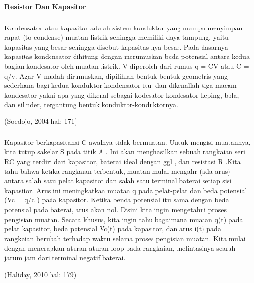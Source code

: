 \documentclass[12pt,a4paper]{article}
\begin{document}
\paragraph{ }
\textbf{Resistor Dan Kapasitor}
\subparagraph{ }
	Kondensator atau kapasitor adalah sistem konduktor yang mampu menyimpan rapat (to condense) muatan listrik sehingga memiliki daya tampung, yaitu kapasitas yang besar sehingga disebut kapasitas nya besar. Pada dasarnya kapasitas kondensator dihitung dengan merumuskan beda potensial antara kedua bagian kondesator oleh muatan listrik. V diperoleh dari rumus q = CV atau C = q/v. Agar V mudah dirumuskan, dipilihlah bentuk-bentuk geometris yang sederhana bagi kedua konduktor kondensator itu, dan dikenallah tiga macam kondesator yakni apa yang dikenal sebagai kodesator-kondesator keping, bola, dan silinder, tergantung bentuk konduktor-konduktornya.
\begin{flushright}
(Soedojo, 2004 hal: 171) 
\end{flushright}

\subparagraph{ }
	\begin{figure}
	
	\end{figure}
	Kapasitor berkapasitansi C awalnya tidak bermuatan. Untuk mengisi muatannya, kita tutup sakelar S pada titik A . Ini akan menghasilkan sebuah rangkaian seri RC yang terdiri dari kapasitor, baterai ideal dengan ggl , dan resistasi R .Kita tahu bahwa ketika rangkaian terbentuk, muatan mulai mengalir (ada arus) antara salah satu pelat kapasitor dan salah satu terminal baterai setiap sisi kapasitor. Arus ini meningkatkan muatan q pada pelat-pelat dan beda potensial (Vc = q/c ) pada kapasitor. Ketika benda potensial itu sama dengan beda potensial pada baterai, arus akan nol. Disini kita ingin mengetahui proses pengisian muatan. Secara khusus, kita ingin tahu bagaimana muatan q(t) pada pelat kapasitor, beda potensial Vc(t) pada kapasitor, dan arus i(t) pada rangkaian berubah terhadap waktu selama proses pengisian muatan. Kita mulai dengan menerapkan aturan-aturan loop pada rangkaian, melintasinya searah jarum jam dari terminal negatif baterai.
\begin{flushright}
(Haliday, 2010 hal: 179) 
\end{flushright}

\paragraph{ }
\textbf{ }
\subparagraph{ }
\end{document}
